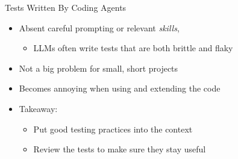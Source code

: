 \documentclass[
ps,
]{prosper}
\begin{document}
\begin{slide}{Tests Written By Coding Agents}

\begin{itemize}
  
\item Absent careful prompting or relevant \textit{skills},

  \begin{itemize}

  \item LLMs often write tests that are both brittle and flaky

  \end{itemize}

\item Not a big problem for small, short projects

\item Becomes annoying when using and extending the code

\end{itemize}

\vspace*{.5cm}

\begin{itemize}
  
\item Takeaway:

  \begin{itemize}
    
  \item Put good testing practices into the context
    
  \item Review the tests to make sure they stay useful
    
  \end{itemize}
  
\end{itemize}

\end{slide}
\end{document}
